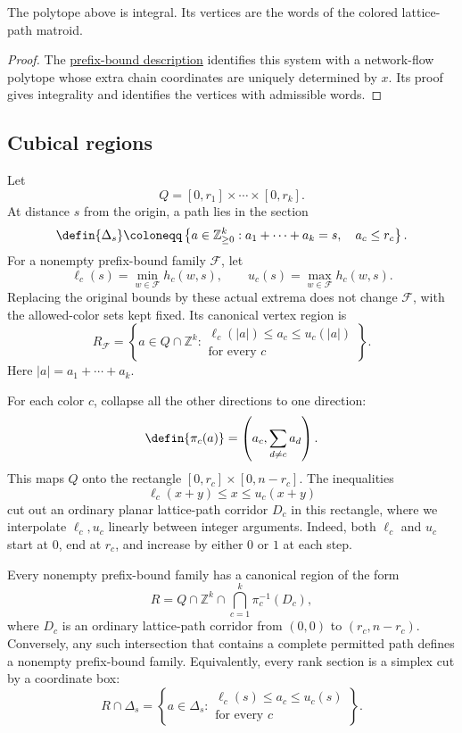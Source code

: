 \begin{proposition}
The polytope above is integral. Its vertices are the words of the colored
lattice-path matroid.
\end{proposition}

\begin{proof}
The \href{polytope.htm#latticePathDescription}{prefix-bound description}
identifies this system with a network-flow polytope whose extra chain
coordinates are uniquely determined by $x$. Its proof gives integrality
and identifies the vertices with admissible words.
\end{proof}

\subsection[pathRegions]{Cubical regions}

Let
\[
 Q=[0,r_1]\times\dotsm\times[0,r_k].
\]
At distance $s$ from the origin, a path lies in the section
\[
 \defin{\Delta_s}\coloneqq\left\{a\in\mathbb Z_{\geq0}^k:
 a_1+\dotsb+a_k=s,\quad a_c\leq r_c\right\}.
\]
For a nonempty prefix-bound family $\mathcal F$, let
\[
 \ell_c(s)=\min_{w\in\mathcal F}h_c(w,s),
 \qquad
 u_c(s)=\max_{w\in\mathcal F}h_c(w,s).
\]
Replacing the original bounds by these actual extrema does not change
$\mathcal F$, with the allowed-color sets kept fixed. Its canonical vertex
region is
\[
 R_{\mathcal F}=\left\{a\in Q\cap\mathbb Z^k:
 \begin{array}{c}
  \ell_c(|a|)\leq a_c\leq u_c(|a|)\\
  \text{for every }c
 \end{array}\right\}.
\]
Here $|a|=a_1+\dotsb+a_k$.

For each color $c$, collapse all the other directions to one direction:
\[
 \defin{\pi_c(a)}=\left(a_c,\sum_{d\neq c}a_d\right).
\]
This maps $Q$ onto the rectangle
$[0,r_c]\times[0,n-r_c]$. The inequalities
\[
 \ell_c(x+y)\leq x\leq u_c(x+y)
\]
cut out an ordinary planar lattice-path corridor $D_c$ in this rectangle,
where we interpolate $\ell_c,u_c$ linearly between integer arguments.
Indeed, both $\ell_c$ and $u_c$ start at $0$, end at $r_c$, and increase by
either $0$ or $1$ at each step.

\begin{theorem}
Every nonempty prefix-bound family has a canonical region of the form
\[
 R=Q\cap\mathbb Z^k\cap\bigcap_{c=1}^k\pi_c^{-1}(D_c),
\]
where $D_c$ is an ordinary lattice-path corridor from $(0,0)$ to
$(r_c,n-r_c)$. Conversely, any such intersection that contains a complete
permitted path defines a nonempty prefix-bound family. Equivalently, every
rank section is a simplex cut by a coordinate box:
\[
 R\cap\Delta_s=
 \left\{a\in\Delta_s:
 \begin{array}{c}
  \ell_c(s)\leq a_c\leq u_c(s)\\
  \text{for every }c
 \end{array}\right\}.
\]
\end{theorem}

